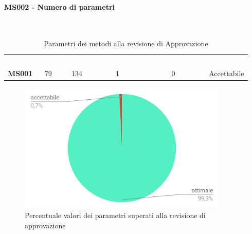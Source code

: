 \paragraph{MS002 - Numero di parametri}\mbox{}\\[0,3cm]
    \begin{table}[H]
        \centering
        \begin{tabular}{cccccc}
            \rowcolor{greySWEight}
            \textcolor{white}{\textbf{Codice}} &
            \textcolor{white}{\textbf{Files}} &
            \textcolor{white}{\textbf{Metodi}}&
            \textcolor{white}{\textbf{Accettabile}}&
            \textcolor{white}{\textbf{Non accettabile}}&
            \textcolor{white}{\textbf{Riscontro}}\\
            \textbf{MS001} & 79 & 134 & 1 & 0 &\textcolor{YellowOrange}{Accettabile}\\
        \end{tabular}
        \caption{Parametri dei metodi alla revisione di Approvazione}
    \end{table}

    \begin{figure}[H]
        \centering
        \includegraphics[width=100mm]{sez/App_Esito/Approvazione/graph/parametri.pdf}
        \caption{Percentuale valori dei parametri superati alla revisione di approvazione}
    \end{figure}

